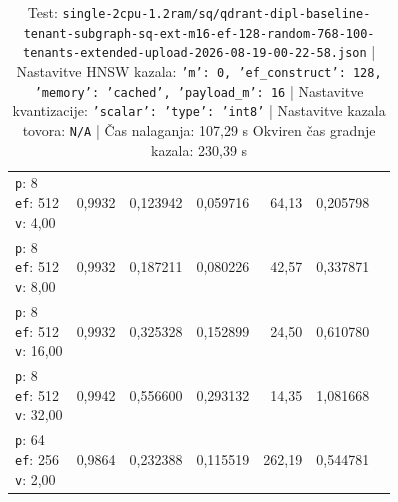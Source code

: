 \begin{table}[htbp]
\begin{tabularx}{\textwidth}{Xrrrrrr}
    \makecell{\texttt{p}: 8\\\texttt{ef}: 512\\\texttt{v}: 4,00} & 0,9932 & 0,123942 & 0,059716 & 64,13 & 0,205798 \\
    \makecell{\texttt{p}: 8\\\texttt{ef}: 512\\\texttt{v}: 8,00} & 0,9932 & 0,187211 & 0,080226 & 42,57 & 0,337871 \\
    \makecell{\texttt{p}: 8\\\texttt{ef}: 512\\\texttt{v}: 16,00} & 0,9932 & 0,325328 & 0,152899 & 24,50 & 0,610780 \\
    \makecell{\texttt{p}: 8\\\texttt{ef}: 512\\\texttt{v}: 32,00} & 0,9942 & 0,556600 & 0,293132 & 14,35 & 1,081668 \\
    \makecell{\texttt{p}: 64\\\texttt{ef}: 256\\\texttt{v}: 2,00} & 0,9864 & 0,232388 & 0,115519 & 262,19 & 0,544781 \\
    \bottomrule
  \end{tabularx}
\caption* {Test: \texttt{single-2cpu-1.2ram/sq/qdrant-dipl-baseline-tenant-subgraph-sq-ext-m16-ef-128-random-768-100-tenants-extended-upload-2026-08-19-00-22-58.json} | Nastavitve HNSW kazala: \texttt{{'m': 0, 'ef\_construct': 128, 'memory': 'cached', 'payload\_m': 16}} | Nastavitve kvantizacije: \texttt{{'scalar': {'type': 'int8'}}} | Nastavitve kazala tovora: \texttt{N/A} | Čas nalaganja: 107,29 s Okviren čas gradnje kazala: 230,39 s}\end{table}


